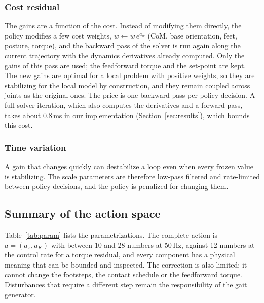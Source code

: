 \documentclass[conference]{IEEEtran}
\begin{document}
\subsubsection{Cost residual}
The gains are a function of the cost.
Instead of modifying them directly, the policy modifies a few cost weights, $w\leftarrow w\,e^{a_w}$ (CoM, base orientation, feet, posture, torque), and the backward pass of the solver is run again along the current trajectory with the dynamics derivatives already computed.
Only the gains of this pass are used; the feedforward torque and the set-point are kept.
The new gains are optimal for a local problem with positive weights, so they are stabilizing for the local model by construction, and they remain coupled across joints as the original ones.
The price is one backward pass per policy decision.
A full solver iteration, which also computes the derivatives and a forward pass, takes about 0.8\,ms in our implementation (Section~\ref{sec:results}), which bounds this cost.

\subsubsection{Time variation}
A gain that changes quickly can destabilize a loop even when every frozen value is stabilizing.
The scale parameters are therefore low-pass filtered and rate-limited between policy decisions, and the policy is penalized for changing them.

\subsection{Summary of the action space}
Table~\ref{tab:param} lists the parametrizations.
The complete action is $a=(a_x,a_K)$ with between 10 and 28 numbers at 50\,Hz, against 12 numbers at the control rate for a torque residual, and every component has a physical meaning that can be bounded and inspected.
The correction is also limited: it cannot change the footsteps, the contact schedule or the feedforward torque.
Disturbances that require a different step remain the responsibility of the gait generator.
\end{document}

